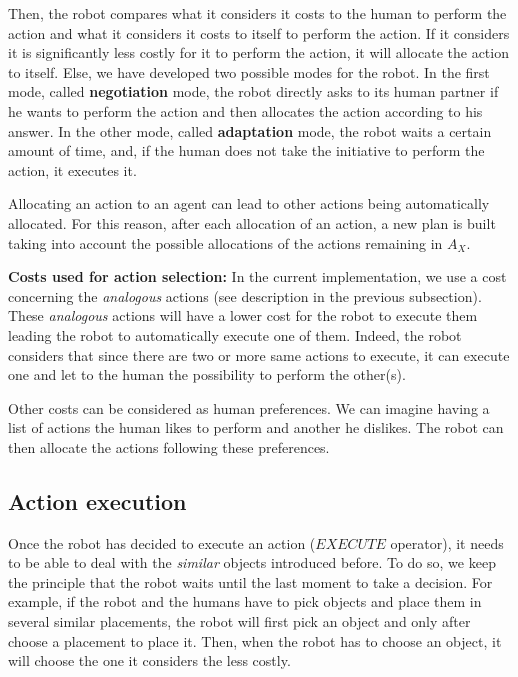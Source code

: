 \documentclass[english,a4paper,11pt,twoside]{StyleThese}
\begin{document}
Then, the robot compares what it considers it costs to the human to perform the action and what it considers it costs to itself to perform the action. If it considers it is significantly less costly for it to perform the action, it will allocate the action to itself. Else, we have developed two possible modes for the robot. In the first mode, called \textbf{negotiation} mode, the robot directly asks to its human partner if he wants to perform the action and then allocates the action according to his answer. In the other mode, called \textbf{adaptation} mode, the robot waits a certain amount of time, and, if the human does not take the initiative to perform the action, it executes it. 

Allocating an action to an agent can lead to other actions being automatically allocated. For this reason, after each allocation of an action, a new plan is built taking into account the possible allocations of the actions remaining in $A_X$.

\textbf{Costs used for action selection:}
In the current implementation, we use a cost concerning the \textit{analogous} actions (see description in the previous subsection). These \textit{analogous} actions will have a lower cost for the robot to execute them leading the robot to automatically execute one of them. Indeed, the robot considers that since there are two or more same actions to execute, it can execute one and let to the human the possibility to perform the other(s).

Other costs can be considered as human preferences. We can imagine having a list of actions the human likes to perform and another he dislikes. The robot can then allocate the actions following these preferences.

\subsection{Action execution}
\label{subsec:execution}

Once the robot has decided to execute an action ($EXECUTE$ operator), it needs to be able to deal with the \textit{similar} objects introduced before. To do so, we keep the principle that the robot waits until the last moment to take a decision. For example, if the robot and the humans have to pick objects and place them in several similar placements, the robot will first pick an object and only after choose a placement to place it. Then, when the robot has to choose an object, it will choose the one it considers the less costly.
\end{document}
